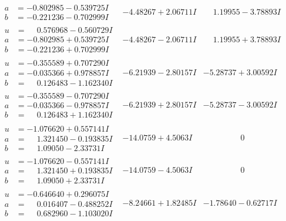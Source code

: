 \documentclass[1p]{elsarticle_modified}
\theoremstyle{definition}
\begin{document}
$$\begin{array}{c|c|c}
\begin{aligned}
a &= -0.802985 - 0.539725 I \\
b &= -0.221236 - 0.702999 I\end{aligned}
 & -4.48267 + 2.06711 I & \phantom{-}1.19955 - 3.78893 I \\ \hline\begin{aligned}
u &= \phantom{-}0.576968 - 0.560729 I \\
a &= -0.802985 + 0.539725 I \\
b &= -0.221236 + 0.702999 I\end{aligned}
 & -4.48267 - 2.06711 I & \phantom{-}1.19955 + 3.78893 I \\ \hline\begin{aligned}
u &= -0.355589 + 0.707290 I \\
a &= -0.035366 + 0.978857 I \\
b &= \phantom{-}0.126483 - 1.162340 I\end{aligned}
 & -6.21939 - 2.80157 I & -5.28737 + 3.00592 I \\ \hline\begin{aligned}
u &= -0.355589 - 0.707290 I \\
a &= -0.035366 - 0.978857 I \\
b &= \phantom{-}0.126483 + 1.162340 I\end{aligned}
 & -6.21939 + 2.80157 I & -5.28737 - 3.00592 I \\ \hline\begin{aligned}
u &= -1.076620 + 0.557141 I \\
a &= \phantom{-}1.321450 - 0.193835 I \\
b &= \phantom{-}1.09050 - 2.33731 I\end{aligned}
 & -14.0759 + 4.5063 I & \phantom{-0.000000 } 0 \\ \hline\begin{aligned}
u &= -1.076620 - 0.557141 I \\
a &= \phantom{-}1.321450 + 0.193835 I \\
b &= \phantom{-}1.09050 + 2.33731 I\end{aligned}
 & -14.0759 - 4.5063 I & \phantom{-0.000000 } 0 \\ \hline\begin{aligned}
u &= -0.646640 + 0.296075 I \\
a &= \phantom{-}0.016407 - 0.488252 I \\
b &= \phantom{-}0.682960 - 1.103020 I\end{aligned}
 & -8.24661 + 1.82485 I & -1.78640 - 0.62717 I \\ \hline\begin{aligned}

\end{aligned}
\end{array}$$
\end{document}
